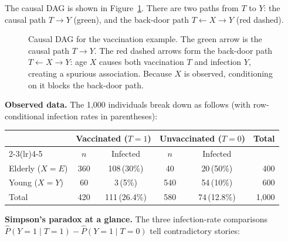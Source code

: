 \documentclass[master.tex]{subfiles}
\begin{document}
The causal DAG is shown in Figure~\ref{w1:fig:vaccination}.  There are two
paths from $T$ to $Y$: the causal path $T \to Y$ (green), and the back-door
path $T \leftarrow X \to Y$ (red dashed).

\begin{figure}[h]
\centering
{}
\caption{Causal DAG for the vaccination example.  The green arrow is the
causal path $T \to Y$.  The red dashed arrows form the back-door path
$T \leftarrow X \to Y$: age $X$ causes both vaccination $T$ and infection
$Y$, creating a spurious association.  Because $X$ is observed, conditioning
on it blocks the back-door path.}
\label{w1:fig:vaccination}
\end{figure}

\medskip
\noindent\textbf{Observed data.}
The 1{,}000 individuals break down as follows (with row-conditional infection
rates in parentheses):

\begin{center}
\renewcommand{\arraystretch}{1.3}
\begin{tabular}{@{}lccccr@{}}
\toprule
& \multicolumn{2}{c}{\textbf{Vaccinated ($T=1$)}}
& \multicolumn{2}{c}{\textbf{Unvaccinated ($T=0$)}} & Total \\
\cmidrule(lr){2-3}\cmidrule(lr){4-5}
& $n$ & Infected & $n$ & Infected & \\
\midrule
Elderly ($X=E$) & 360 & 108\,(30\%) & 40  & 20\,(50\%) & 400 \\
Young ($X=Y$)   &  60 &   3\,(5\%)  & 540 & 54\,(10\%) & 600\\
\midrule
Total           & 420 & 111\,(26.4\%) & 580 & 74\,(12.8\%) & 1,000\\
\bottomrule
\end{tabular}
\end{center}

\medskip
\noindent\textbf{Simpson's paradox at a glance.}
The three infection-rate comparisons $\hat{P}(Y{=}1\mid T{=}1) - \hat{P}(Y{=}1\mid T{=}0)$
tell contradictory stories:
\end{document}
